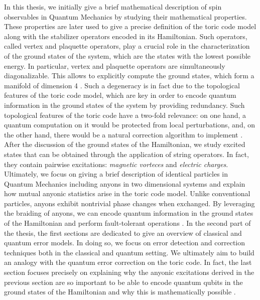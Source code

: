 \documentclass{Configuration_Files/PoliMi3i_thesis}
\begin{document}
In this thesis, we initially give a brief mathematical description
of spin observables in Quantum Mechanics by studying their mathematical properties. 
These properties are later used to give a precise definition of the toric code model along with the stabilizer operators encoded in its Hamiltonian. Such operators, called vertex and plaquette operators, play a crucial role in the characterization of the ground states of the system, which are the states with the lowest possible energy.
In particular, vertex and plaquette operators are simultaneously diagonalizable. This allows to explicitly compute the ground states, which form a manifold of dimension 4 \cite{Her20}. Such a degeneracy is in fact due to the topological features of the toric code model, which are key in order to encode quantum information in the ground states of the system by providing redundancy. Such topological features of the toric code have a two-fold relevance: on one hand, a quantum computation on it would be protected from local perturbations, and, on the other hand, there would be a natural correction algorithm to implement \cite{Zbi19}. After the discussion of the ground states of the Hamiltonian, we study excited states that can be obtained through the application of string operators. In fact, they contain pairwise excitations: {\it magnetic vorteces} and {\it electric charges}. Ultimately, we focus on giving a brief description of identical particles in Quantum Mechanics including anyons in two dimensional systems and explain how mutual anyonic
statistics arise in the toric code model. Unlike conventional particles, anyons exhibit nontrivial phase changes when exchanged. By leveraging the braiding of anyons, we can encode quantum information in the ground states of the Hamiltonian and perform fault-tolerant operations \cite{Rao01,Rao16}. \newline
In the second part of the thesis, the first sections are dedicated to give an overview of 
classical and quantum error models. In doing so, we focus on error detection and correction
techniques both in the classical and quantum setting. We ultimately aim to build an analogy with the quantum error correction on the toric code. In fact, the last section focuses precisely on explaining why the anyonic excitations derived in the previous section are so important to be able to encode quantum qubits in the ground states of the Hamiltonian and why this is mathematically possible \cite{Zbi19}. \newline 
\end{document}
